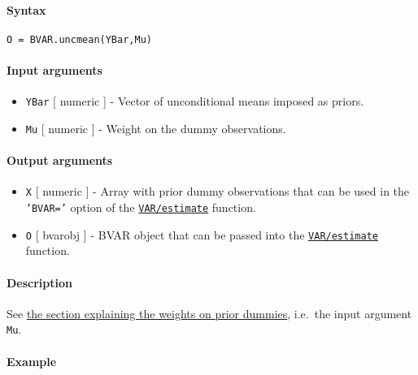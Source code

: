 


	\paragraph{Syntax}

\begin{verbatim}
O = BVAR.uncmean(YBar,Mu)
\end{verbatim}

\paragraph{Input arguments}

\begin{itemize}
\item
  \texttt{YBar} {[} numeric {]} - Vector of unconditional means imposed
  as priors.
\item
  \texttt{Mu} {[} numeric {]} - Weight on the dummy observations.
\end{itemize}

\paragraph{Output arguments}

\begin{itemize}
\item
  \texttt{X} {[} numeric {]} - Array with prior dummy observations that
  can be used in the \texttt{'BVAR='} option of the
  \href{VAR/estimate}{\texttt{VAR/estimate}} function.
\item
  \texttt{O} {[} bvarobj {]} - BVAR object that can be passed into the
  \href{VAR/estimate}{\texttt{VAR/estimate}} function.
\end{itemize}

\paragraph{Description}

See \href{BVAR/Contents}{the section explaining the weights on prior
dummies}, i.e.~the input argument \texttt{Mu}.

\paragraph{Example}


